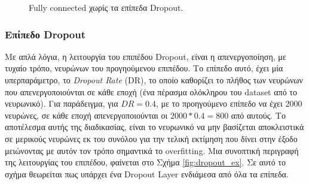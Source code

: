 \begin{figure}[h]
\caption{Fully connected χωρίς τα επίπεδα Dropout.}
\label{fig:FC_Arch}
\end{figure}

\subsubsection{Επίπεδο Dropout}
Με απλά λόγια, η λειτουργία του επιπέδου Dropout, είναι η απενεργοποίηση, με τυχαίο τρόπο, νευρώνων του προγηούμενου επιπέδου. Το επίπεδο αυτό, έχει μία υπερπαράμετρο, το \textit{Dropout Rate} (DR), το οποίο καθορίζει το πλήθος των νευρώνων που απενεργοποιούνται σε κάθε εποχή (ένα πέρασμα ολόκληρου του dataset από το νευρωνικό). Για παράδειγμα, για $DR=0.4$, με το προηγούμενο επίπεδο να έχει 2000 νευρώνες, σε κάθε εποχή απενεργοποιούνται οι $2000*0.4 = 800$ από αυτούς. Το αποτέλεσμα αυτής της διαδικασίας, είναι το νευρωνικό να μην βασίζεται αποκλειστικά σε μερικούς νευρώνες εκ του συνόλου για την τελική εκτίμηση που δίνει στην έξοδο μειώνοντας με αυτόν τον τρόπο σημαντικά το overfitting. Μια συνοπτική περιγραφή της λειτουργίας του επιπέδου, φαίνεται στο Σχήμα \ref{fig:dropout_ex}. Σε αυτό το σχήμα θεωρείται πως υπάρχει ένα Dropout Layer ενδιάμεσα από όλα τα επίπεδα.

